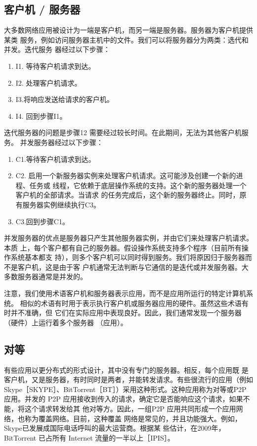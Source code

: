 \subsection{客户机 / 服务器}
大多数网络应用被设计为一端是客户机，而另一端是服务器。服务器为客户机提供某类
服务，例如访问服务器主机中的文件。我们可以将服务器分为两类：选代和并发。迭代服务
器经过以下步骤：
\begin{enumerate}
    \item I1. 等待客户机请求到达。
    \item I2. 处理客户机请求。
    \item I3.将响应发送给请求的客户机。
    \item I4. 回到步骤I1。
\end{enumerate}
迭代服务器的问题是步骤12 需要经过较长时间。在此期间，无法为其他客户机服务。
并发服务器经过以下步骤：

\begin{enumerate}
    \item C1.等待客户机请求到达。
    \item C2. 启用一个新服务器实例来处理客户机请求。这可能涉及创建一个新的进程、任务或
    线程，它依赖于底层操作系统的支持。这个新的服务器处理一个客户机的全部请求。当请求
    的任务完成后，这个新的服务器终止。同时，原有服务器实例继续执行C3。
    \item C3.回到步骤C1。
\end{enumerate}
并发服务器的优点是服务器只产生其他服务器实例，并由它们来处理客户机请求。本质
上，每个客户都有自己的服务器。假设操作系统支持多个程序（目前所有操作系统基本都支
持），则多个客户机可以同时得到服务。我们将原因归于服务器而不是客户机，这是由于客
户机通常无法判断与它通信的是迭代或并发服务器。大多数服务器通常是并发的。

注意，我们使用术语客户机和服务器表示应用，而不是应用所运行的特定计算机系统。
相似的术语有时用于表示执行客户机或服务器应用的硬件。虽然这些术语有时并不准确，但
它们在实际应用中表现良好。因此，我们通常发现一个服务器（硬件）上运行着多个服务器
（应用）。
\subsection{对等}
有些应用以更分布式的形式设计，其中没有专门的服务器。相反，每个应用既
是客户机，又是服务器，有时同时是两者，并能转发请求。有些很流行的应用（例如
Skype［SKYPE］、BitTorrent［BT］）采用这种形式。这种应用称为对等或P2P应用。并发的
P2P 应用接收到传入的请求，确定它是否能响应这个请求，如果不能，将这个请求转发给其
他对等方。因此，一组P2P 应用共同形成一个应用网络，也称为覆盖网络。目前，这种覆盖
网络是常见的，并且功能强大。例如，Skype已发展成国际电话呼叫的最大运营商。根据某
些估计，在2009年，BitTorrent 已占所有 Internet 流量的一半以上［IPIS］。

